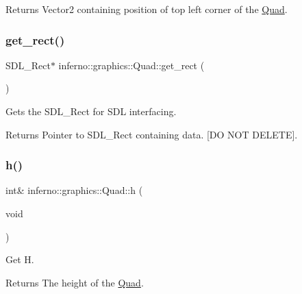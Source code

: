 \begin{DoxyReturn}{Returns}
Vector2 containing position of top left corner of the \mbox{\hyperlink{classinferno_1_1graphics_1_1_quad}{Quad}}. 
\end{DoxyReturn}
\mbox{\label{classinferno_1_1graphics_1_1_quad_a104d87586cb42af3eac4a4e0bd8b2b60}} 
\subsubsection{\texorpdfstring{get\+\_\+rect()}{get\_rect()}}
{\footnotesize\ttfamily S\+D\+L\+\_\+\+Rect$\ast$ inferno\+::graphics\+::\+Quad\+::get\+\_\+rect (\begin{DoxyParamCaption}{ }\end{DoxyParamCaption})\hspace{0.3cm}{\ttfamily [inline]}}



Gets the S\+D\+L\+\_\+\+Rect for S\+DL interfacing. 

\begin{DoxyReturn}{Returns}
Pointer to S\+D\+L\+\_\+\+Rect containing data. \mbox{[}DO N\+OT D\+E\+L\+E\+TE\mbox{]}. 
\end{DoxyReturn}
\mbox{\label{classinferno_1_1graphics_1_1_quad_af5653f4d125b24ac94ab8367e310e541}} 
\subsubsection{\texorpdfstring{h()}{h()}}
{\footnotesize\ttfamily int\& inferno\+::graphics\+::\+Quad\+::h (\begin{DoxyParamCaption}\item[{void}]{ }\end{DoxyParamCaption})\hspace{0.3cm}{\ttfamily [inline]}}



Get H. 

\begin{DoxyReturn}{Returns}
The height of the \mbox{\hyperlink{classinferno_1_1graphics_1_1_quad}{Quad}}. 
\end{DoxyReturn}
\mbox{\label{classinferno_1_1graphics_1_1_quad_ab2956c4435741605c0943d5e6087e690}} 
